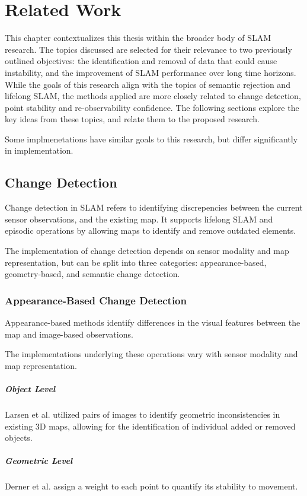 \section{Related Work}
\label{sec:related_work}

This chapter contextualizes this thesis within the broader body of SLAM research. The topics discussed are selected for their relevance to two previously outlined objectives: the identification and removal of data that could cause instability, and the improvement of SLAM performance over long time horizons. While the goals of this research align with the topics of semantic rejection and lifelong SLAM, the methods applied are more closely related to change detection, point stability and re-observability confidence. The following sections explore the key ideas from these topics, and relate them to the proposed research.

Some implmenetations have similar goals to this research, but differ significantly in implementation. 

\subsection{Change Detection}

Change detection in SLAM refers to identifying discrepencies between the current sensor observations, and the existing map. It supports lifelong SLAM and episodic operations by allowing maps to identify and remove outdated elements.

The implementation of change detection depends on sensor modality and map representation, but can be split into three categories: appearance-based, geometry-based, and semantic change detection.

\subsubsection{Appearance-Based Change Detection}

Appearance-based methods identify differences in the visual features between the map and image-based observations. 

The implementations underlying these operations vary with sensor modality and map representation.




\subparagraph{Object Level}
Larsen et al. \cite{larsenChangeDetectionModel} utilized pairs of images to identify geometric inconsistencies in existing 3D maps, allowing for the identification of individual added or removed objects.

\subparagraph{Geometric Level}
Derner et al. \cite{dernerChangeDetectionUsing2021} assign a weight to each point to quantify its stability to movement.




